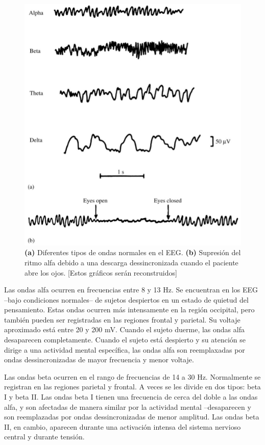 \begin{figure}
\centering
\includegraphics[width=0.5\linewidth]{figura_4.png} 
\caption{\textbf{(a)} Diferentes tipos de ondas normales en el EEG.
\textbf{(b)} Supresi\'on del ritmo alfa debido a una descarga dessincronizada cuando
el paciente abre los ojos.
[Estos gr\'aficos ser\'an reconstruidos]
}
\label{ritmos}
\end{figure}


Las ondas alfa ocurren en frecuencias entre 8 y 13 Hz. 
Se encuentran en
los EEG --bajo condiciones normales--
de sujetos despiertos en un estado de quietud del pensamiento.
Estas ondas ocurren m\'as intensamente en la regi\'on occipital, pero tambi\'en pueden ser
registradas en las regiones frontal y parietal. Su voltaje aproximado est\'a entre 20 y 200 mV.
Cuando el sujeto duerme, las ondas alfa desaparecen completamente. 
Cuando el sujeto est\'a
despierto y su atenci\'on se dirige a una actividad mental espec\'ifica, las ondas alfa
son reemplaxadas por ondas dessincronizadas de mayor frecuencia y menor voltaje.

Las ondas beta ocurren en el rango de frecuencias de 14 a 30 Hz.
Normalmente se registran en las regiones parietal y frontal. A veces se les divide
 en dos tipos: beta I y beta II. Las ondas beta I tienen una frecuencia de cerca del doble a
 las ondas alfa, y son afectadas de manera similar por la actividad mental --desaparecen
y son reemplazadas por ondas dessincronizadas de menor amplitud.
Las ondas beta II, en cambio, aparecen durante una activaci\'on intensa del sistema nervioso
central y durante tensi\'on.

